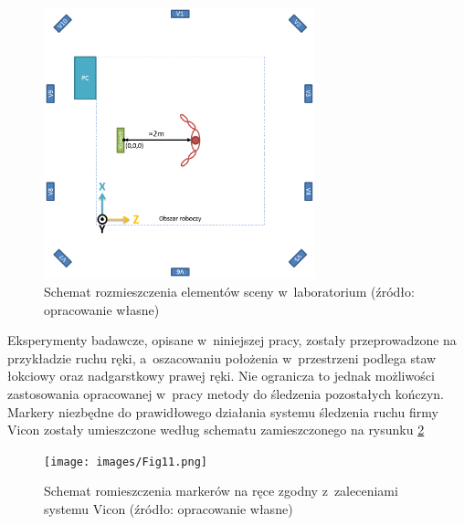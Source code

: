 \begin{savenotes}
	\begin{figure}[!htb]
		\centering
		\includegraphics[width=0.7\textwidth]{images/scene.png}
		\caption{Schemat rozmieszczenia elementów sceny w~laboratorium  (źródło: opracowanie własne)}
		\label{fig:experiments:scene}
	\end{figure}
\end{savenotes}
		  
		 
Eksperymenty badawcze, opisane w~niniejszej pracy, zostały przeprowadzone na przykładzie ruchu ręki, a~oszacowaniu położenia w~przestrzeni podlega staw łokciowy oraz nadgarstkowy prawej ręki. Nie ogranicza to jednak możliwości zastosowania opracowanej w~pracy metody do śledzenia pozostałych kończyn. Markery niezbędne do prawidłowego działania systemu śledzenia ruchu firmy Vicon zostały umieszczone według schematu zamieszczonego na rysunku \ref{fig:experiments:viconArm}
		
\begin{savenotes}
	\begin{figure}[!htb]
		\centering
		\texttt{[image: images/Fig11.png]}
		\caption{Schemat romieszczenia markerów na ręce zgodny z~zaleceniami systemu Vicon  (źródło: opracowanie własne)}
		\label{fig:experiments:viconArm}
	\end{figure}
\end{savenotes}
				
